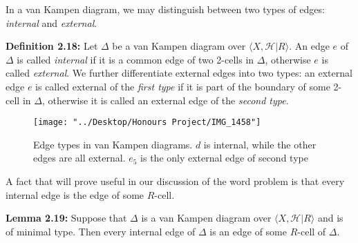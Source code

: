 \documentclass[12pt]{article}
\newcommand{\vs}{\vskip10pt}
\begin{document}
	\vs 
	
	In a van Kampen diagram, we may distinguish between two types of edges: \textit{internal} and \textit{external}. 
	
	\vs 
	
	\textbf{Definition 2.18: } Let $\Delta$ be a van Kampen diagram over $\langle X, \mathcal{H} \vert R \rangle$. An edge $e$ of $\Delta$ is called \textit{internal} if it is a common edge of two 2-cells in $\Delta$, otherwise $e$ is called \textit{external}. We further differentiate external edges into two types: an external edge $e$ is called external of the \textit{first type} if it is part of the boundary of some 2-cell in $\Delta$, otherwise it is called an external edge of the \textit{second type}. 
	
	\begin{figure} [H]
		\centering
		\texttt{[image: "../Desktop/Honours Project/IMG\_1458"]}
		\caption{Edge types in van Kampen diagrams. $d$ is internal, while the other edges are all external. $e_5$ is the only external edge of second type}
		\label{fig:img1458}
	\end{figure}
	
	\vs 
	
	A fact that will prove useful in our discussion of the word problem is that every internal edge is the edge of some $R$-cell. 
	
	\vs 
	
	\textbf{Lemma 2.19: } Suppose that $\Delta$ is a van Kampen diagram over $\langle X, \mathcal{H} \vert R \rangle$ and is of minimal type. Then every internal edge of $\Delta$ is an edge of some $R$-cell of $\Delta$. 
	
\end{document}
